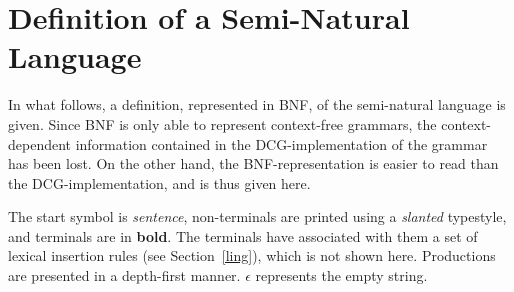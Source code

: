 
\chapter{Definition of a Semi-Natural Language}
\label{app_def}

In what follows, a definition, represented in BNF, of the semi-natural
language {\nal} is given. Since BNF is only able to represent
context-free grammars, the context-dependent information contained in
the DCG-implementation of the grammar has been lost. On the other
hand, the BNF-representation is easier to read than the
DCG-implementation, and is thus given here.

The start symbol is {\sl sentence\/}, non-terminals are printed using
a {\sl slanted\/} typestyle, and terminals are in {\bf bold}. The
terminals have associated with them a set of lexical insertion rules
(see Section~\ref{ling}), which is not shown here. Productions are
presented in a depth-first manner. $\epsilon$ represents the empty
string.

\vspace*{0.7cm}

